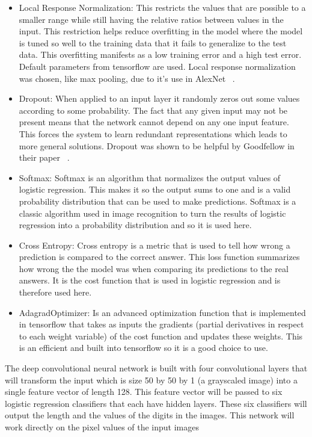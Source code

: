 \documentclass[12pt,twocolumn,letterpaper]{article}
\begin{document}
\begin{itemize}
	\item Local Response Normalization: This restricts the values that are 
	possible to a smaller range while still having the relative ratios between 
	values in the input. This restriction helps reduce overfitting in the model 
	where the model is tuned so well to the training data that it fails to 
	generalize to the test data. This overfitting manifests as a low training 
	error and a high test error. Default parameters from tensorflow are used.
	Local response normalization was chosen, like max pooling, due to it's use 
	in AlexNet ~\cite{alex}.
	\item Dropout: When applied to an input layer it randomly zeros out some 
	values according to some probability. The fact that any given input may not 
	be present means that the network cannot depend on any one input feature. 
	This forces the system to learn redundant representations which leads to 
	more general solutions. Dropout was shown to be helpful by Goodfellow \etal 
	in their paper ~\cite{goodfellow}.
	\item Softmax: Softmax is an algorithm that normalizes the output values of 
	logistic regression. This makes it so the output sums to one and is a valid 
	probability distribution that can be used to make predictions. Softmax is a 
	classic algorithm used in image recognition to turn the results of logistic 
	regression into a probability distribution and so it is used here.
	\item Cross Entropy: Cross entropy is a metric that is used to tell how wrong 
	a prediction is compared to the correct answer. This loss function summarizes 
	how wrong the the model was when comparing its predictions to the real answers.
	It is the cost function that is used in logistic regression and is therefore 
	used here.
	\item AdagradOptimizer: Is an advanced optimization function that is 
	implemented in tensorflow that takes as inputs the gradients (partial 
	derivatives in respect to each weight variable) of the cost function and 
	updates these weights. This is an efficient and built into tensorflow so it 
	is a good choice to use.

\end{itemize}

The deep convolutional neural network is built with four convolutional layers 
that will transform the input which is size 50 by 50 by 1 (a grayscaled image) into a single feature 
vector of length 128. This feature vector will be passed to six logistic regression 
classifiers that each have hidden layers. These six classifiers will output the 
length and the values of the digits in the images. This network will work directly 
on the pixel values of the input images
\end{document}
